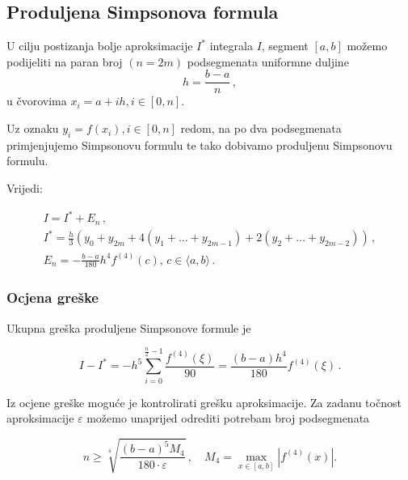 \subsection{Produljena Simpsonova formula}

U cilju postizanja bolje aproksimacije $I^*$ integrala $I$, segment $[a,b]$
možemo podijeliti na paran broj $(n=2m)$ podsegmenata uniformne duljine
$$
h=\frac{b-a}{n}\,,
$$
u čvorovima $x_i=a+ih, i \in [0,n]$.

Uz oznaku $y_i=f(x_i), i \in [0,n]$ redom, na po dva podsegmenata primjenjujemo
Simpsonovu formulu te tako dobivamo produljenu Simpsonovu formulu.

Vrijedi:

\begin{gather*}
    I = I^* + E_n\,,\\
    I^* = \frac{h}{3}(y_0+y_{2m}+4(y_1+\dots+y_{2m-1})+2(y_2+\dots+y_{2m-2}))\,,\\
    E_n = -\frac{b-a}{180}h^4f^{(4)}(c),\, c\in\langle a, b \rangle \,.
\end{gather*}

\pagebreak

\subsubsection{Ocjena greške}

Ukupna greška produljene Simpsonove formule je

$$
I - I^* = -h^5\sum_{i=0}^{\frac{n}{2}-1}\frac{f^{(4)}(\xi)}{90} = \frac{(b-a)h^4}{180}f^{(4)}(\xi)\,.
$$

Iz ocjene greške moguće je kontrolirati grešku aproksimacije. Za zadanu točnost
aproksimacije $\varepsilon$ možemo unaprijed odrediti potrebam broj podsegmenata

$$
n\geq \sqrt[4]{\frac{(b-a)^5M_4}{180\cdot \varepsilon}}\,,\quad M_4 = \max_{x\in[a,b]}|f^{(4)}(x)|.
$$
